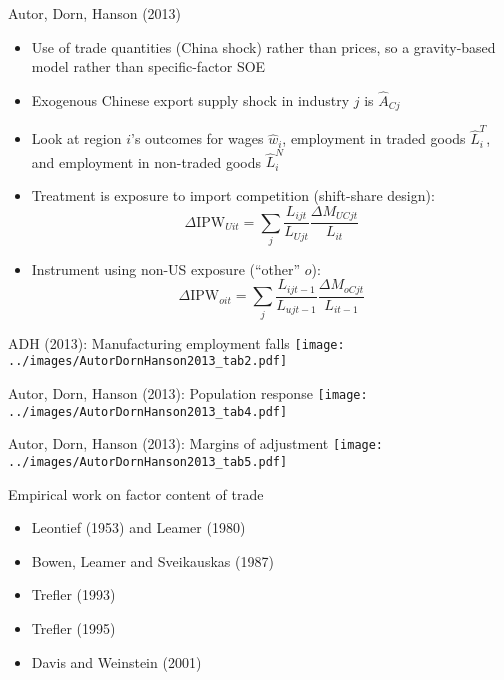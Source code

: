 \documentclass[10pt,notes=hide]{beamer}
\begin{document}
\begin{frame}{Autor, Dorn, Hanson (2013)}
\begin{itemize}
	\item Use of trade quantities (China shock) rather than prices, so a gravity-based model rather than specific-factor SOE
	\item Exogenous Chinese export supply shock in industry $j$ is $\hat{A}_{Cj}$
	\item Look at region $i$'s outcomes for wages $\hat{w}_i$, employment in traded goods $\hat{L}^{T}_{i}$, and employment in non-traded goods $\hat{L}^{N}_{i}$
	\item Treatment is exposure to import competition (shift-share design):
	\begin{equation*}
		\Delta \text{IPW}_{Uit} = \sum_j \frac{L_{ijt}}{L_{Ujt}} \frac{\Delta M_{UCjt}}{L_{it}}
	\end{equation*}
	\item Instrument using non-US exposure (``other'' $o$):
	\begin{equation*}
		\Delta \text{IPW}_{oit} = \sum_j \frac{L_{ijt-1}}{L_{ujt-1}} \frac{\Delta M_{oCjt}}{L_{it-1}}
	\end{equation*}
\end{itemize}
\end{frame}
\begin{frame}{ADH (2013): Manufacturing employment falls}
\texttt{[image: ../images/AutorDornHanson2013\_tab2.pdf]}
\end{frame}
\begin{frame}{Autor, Dorn, Hanson (2013): Population response}
\texttt{[image: ../images/AutorDornHanson2013\_tab4.pdf]}
\end{frame}
\begin{frame}{Autor, Dorn, Hanson (2013): Margins of adjustment}
\texttt{[image: ../images/AutorDornHanson2013\_tab5.pdf]}
\end{frame}
\begin{frame}{Empirical work on factor content of trade}
\begin{itemize}
	\item Leontief (1953) and Leamer (1980)
	\item Bowen, Leamer and Sveikauskas (1987)
	\item Trefler (1993)
	\item Trefler (1995)
	\item Davis and Weinstein (2001)
\end{itemize}
\end{frame}
\end{document}
